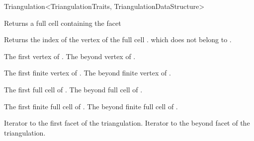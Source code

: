 \begin{ccRefClass}{Triangulation<TriangulationTraits, TriangulationDataStructure>}


{Returns a full cell containing the facet }

{Returns the index of the vertex of the full cell
\ccVar. which does {not} belong to .}


{}
{The first vertex of \ccVar.}
\ccGlue{}
{The beyond vertex of \ccVar.}

{}
{The first finite vertex of \ccVar.}
\ccGlue{}
{The beyond finite vertex of \ccVar.}

{}
{The first full cell of \ccVar.}
\ccGlue{}
{The beyond full cell of \ccVar.}

{}
{The first finite full cell of \ccVar.}
\ccGlue{}
{The beyond finite full cell of \ccVar.}

{Iterator to the first facet of the triangulation.}
\ccGlue
{}
{Iterator to the beyond facet of the triangulation.}


\end{ccRefClass}
